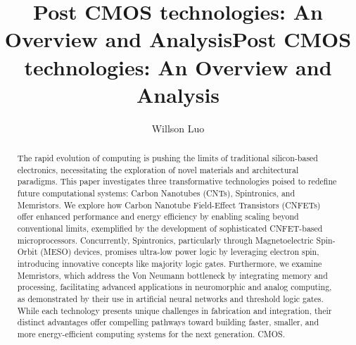 \documentclass[sigconf,authordraft]{acmart}
\title{Post CMOS technologies: An Overview and Analysis}
\begin{document}
\title{Post CMOS technologies: An Overview and Analysis}

\author{Willson Luo}

\begin{abstract}
  The rapid evolution of computing is pushing the limits of traditional 
  silicon-based electronics, necessitating the exploration of 
  novel materials and architectural paradigms. This paper 
  investigates three transformative technologies poised to 
  redefine future computational systems: Carbon Nanotubes 
  (CNTs), Spintronics, and Memristors. We explore how Carbon 
  Nanotube Field-Effect Transistors (CNFETs) offer enhanced 
  performance and energy efficiency by enabling scaling beyond 
  conventional limits, exemplified by the development of 
  sophisticated CNFET-based microprocessors. Concurrently, 
  Spintronics, particularly through Magnetoelectric Spin-Orbit 
  (MESO) devices, promises ultra-low power logic by leveraging 
  electron spin, introducing innovative concepts like majority 
  logic gates. Furthermore, we examine Memristors, which address 
  the Von Neumann bottleneck by integrating memory and processing, 
  facilitating advanced applications in neuromorphic and analog 
  computing, as demonstrated by their use in artificial neural 
  networks and threshold logic gates. While each technology 
  presents unique challenges in fabrication and integration, 
  their distinct advantages offer compelling pathways toward 
  building faster, smaller, and more energy-efficient computing 
  systems for the next generation.
  CMOS.
\end{abstract}
\end{document}
